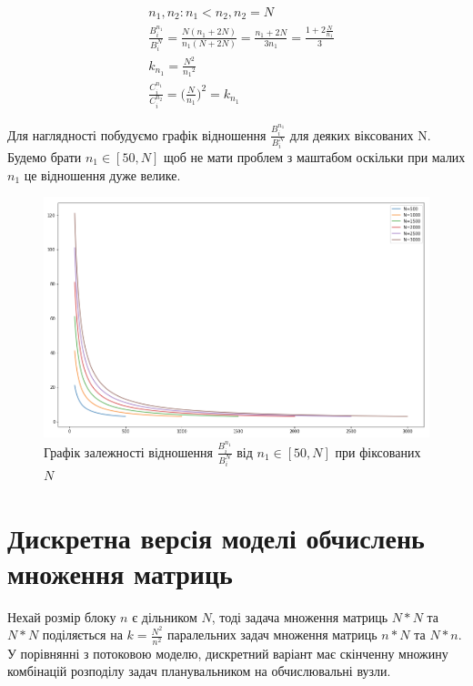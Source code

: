 \begin{equation}
\label{eq:diff_n1n2}
	\begin{aligned}
	& n_1, n_2 : n_1 < n_2, n_2 = N
	\\
	& \frac{B_i^{n_1}}{B_i^{N}} =\frac{ N ( n_1 + 2N ) }{n_1 ( N + 2N )} = \frac{n_1 + 2N}{3n_1} = \frac{1 + 2\frac{N}{n_1}}{3}
	\\
	& k_{n_1} = \frac{N^2}{{n_{1}}^{2}}
	\\
	& \frac{C_i^{n_1}}{C_i^{n_2}} = \bigg( \frac{N}{n_1} \bigg)^2 = k_{n_1}
	\end{aligned}
\end{equation}

Для наглядності побудуємо графік відношення $\frac{B_i^{n_1}}{B_i^{N}}$ для деяких віксованих N. Будемо брати $n_1 \in [50, N]$ щоб не мати проблем з маштабом оскільки при малих $n_1$ це відношення дуже велике.

\begin{figure}[H]
	\centering
	\includegraphics[width=\textwidth]{theory/img/B_times_diff_N}
	\caption{Графік залежності відношення $\frac{B_i^{n_1}}{B_i^{N}}$ від $n_1 \in [50, N]$ при фіксованих $N$ }
	\label{fig:one_diff_N}
\end{figure}


\section{Дискретна версія моделі обчислень множення матриць}
Нехай розмір блоку $n$ є дільником $N$, тоді задача множення матриць $N*N$ та $N*N$ поділяється на $k = \frac{N^2}{n^2}$ паралельних задач множення матриць $n*N$ та $N*n$.
У порівнянні з потоковою моделю, дискретний варіант має скінченну множину комбінацій розподілу задач планувальником на обчислювальні вузли.

